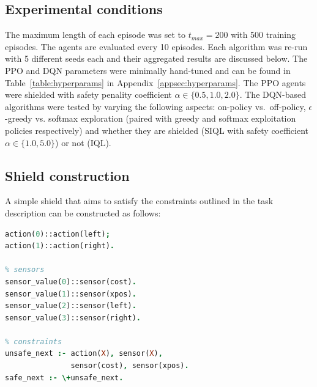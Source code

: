 \subsection{Experimental conditions}
The maximum length of each episode was set to $t_{max}=200$ with 500 training episodes. The agents are evaluated every 10 episodes. Each algorithm was re-run with 5 different seeds each and their aggregated results are discussed below. The PPO and DQN parameters were minimally hand-tuned and can be found in Table~\ref{table:hyperparams} in Appendix~\ref{appsec:hyperparams}. The PPO agents were shielded with safety penality coefficient $\alpha\in\{0.5,1.0,2.0\}$. The DQN-based algorithms were tested by varying the following aspects: on-policy vs.\ off-policy, $\epsilon$-greedy vs. softmax exploration (paired with greedy and softmax exploitation policies respectively) and whether they are shielded (SIQL with safety coefficient $\alpha\in\{1.0,5.0\}$) or not (IQL).



\subsection{Shield construction}
A simple shield that aims to satisfy the constraints outlined in the task description can be constructed as follows:
\begin{lstlisting}[language=Prolog, caption={Shield for soft constraint satisfaction for \textit{CartSafe}.}, label={shield:cartsafe}]
% actions
action(0)::action(left);
action(1)::action(right).

% sensors
sensor_value(0)::sensor(cost).
sensor_value(1)::sensor(xpos).
sensor_value(2)::sensor(left).
sensor_value(3)::sensor(right).

% constraints
unsafe_next :- action(X), sensor(X), 
               sensor(cost), sensor(xpos).
safe_next :- \+unsafe_next.
\end{lstlisting}

